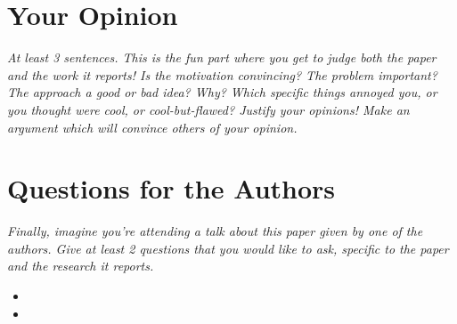 \documentclass[11pt]{article}
\begin{document}
\section*{Your Opinion}
\textsl{At least 3 sentences. This is the fun part where you get to judge both the paper and the work it reports! Is the motivation convincing? The problem important? The approach a good or bad idea?  Why? Which specific things annoyed you, or you thought were cool, or cool-but-flawed? Justify your opinions! Make an argument which will convince others of your opinion.}


\section*{Questions for the Authors}
\textsl{Finally, imagine you're attending a talk about this paper given by one of the authors. Give at least 2 questions that you would like to ask, specific to the paper and the research it reports.}


\begin{itemize}
	\item 
	\item 
\end{itemize}


\footnotesize{}
\end{document}
